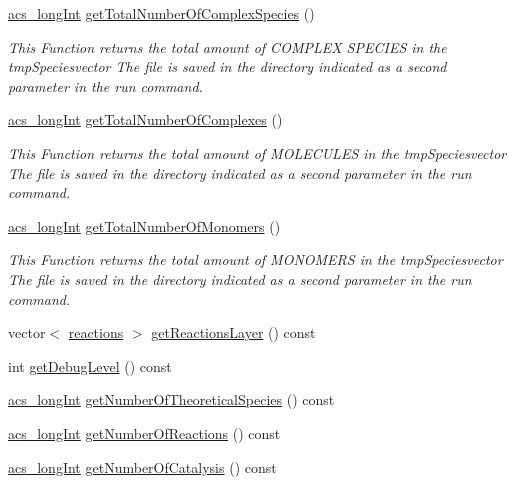 \begin{DoxyCompactItemize}
\hyperlink{a00024_a19319d75f02db4308bc5c0026d98cd85}{acs\-\_\-long\-Int} \hyperlink{a00011_a453d88017912e8b5973310ea2b044266}{get\-Total\-Number\-Of\-Complex\-Species} ()
\begin{DoxyCompactList}\small\item\em This Function returns the total amount of C\-O\-M\-P\-L\-E\-X S\-P\-E\-C\-I\-E\-S in the tmp\-Speciesvector The file is saved in the directory indicated as a second parameter in the run command. \end{DoxyCompactList}\item 
\hyperlink{a00024_a19319d75f02db4308bc5c0026d98cd85}{acs\-\_\-long\-Int} \hyperlink{a00011_ab564c7ddffd3dba896d5b049e1257793}{get\-Total\-Number\-Of\-Complexes} ()
\begin{DoxyCompactList}\small\item\em This Function returns the total amount of M\-O\-L\-E\-C\-U\-L\-E\-S in the tmp\-Speciesvector The file is saved in the directory indicated as a second parameter in the run command. \end{DoxyCompactList}\item 
\hyperlink{a00024_a19319d75f02db4308bc5c0026d98cd85}{acs\-\_\-long\-Int} \hyperlink{a00011_aa8c94019533639038f99587fc2b029dc}{get\-Total\-Number\-Of\-Monomers} ()
\begin{DoxyCompactList}\small\item\em This Function returns the total amount of M\-O\-N\-O\-M\-E\-R\-S in the tmp\-Speciesvector The file is saved in the directory indicated as a second parameter in the run command. \end{DoxyCompactList}\item 
vector$<$ \hyperlink{a00021}{reactions} $>$ \hyperlink{a00011_a3d44f3f4a8f9010fa99c49f5cc961416}{get\-Reactions\-Layer} () const 
\item 
int \hyperlink{a00011_a2de42381b0b9cba889bbb95c1456cfe5}{get\-Debug\-Level} () const 
\item 
\hyperlink{a00024_a19319d75f02db4308bc5c0026d98cd85}{acs\-\_\-long\-Int} \hyperlink{a00011_ab98d4ad28b101f08279aa3458d5dfda3}{get\-Number\-Of\-Theoretical\-Species} () const 
\item 
\hyperlink{a00024_a19319d75f02db4308bc5c0026d98cd85}{acs\-\_\-long\-Int} \hyperlink{a00011_abf45b6406f8c0e95c4c5edf6b374e112}{get\-Number\-Of\-Reactions} () const 
\item 
\hyperlink{a00024_a19319d75f02db4308bc5c0026d98cd85}{acs\-\_\-long\-Int} \hyperlink{a00011_a21609adb1a83a4cb7eaec78a90acd624}{get\-Number\-Of\-Catalysis} () const 

\end{DoxyCompactItemize}
